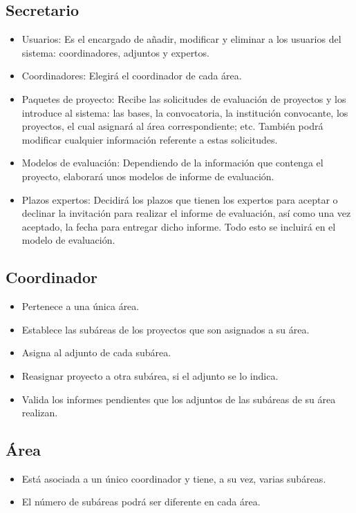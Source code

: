 \documentclass[12pt,a4paper,spanish,twoside]{book}
\begin{document}
\subsection{Secretario}
\begin{itemize}
\item Usuarios: Es el encargado de añadir, modificar y eliminar a los
  usuarios del sistema: coordinadores, adjuntos y expertos.
\item Coordinadores: Elegirá el coordinador de cada área.
\item Paquetes de proyecto: Recibe las solicitudes de evaluación de proyectos
  y los introduce al sistema: las bases, la convocatoria, la institución
  convocante, los proyectos, el cual asignará al área correspondiente;
  etc. También podrá modificar cualquier información referente a estas
  solicitudes. 
\item Modelos de evaluación: Dependiendo de la información que contenga el
  proyecto, elaborará unos modelos de informe de evaluación. 
\item Plazos expertos: Decidirá los plazos que tienen los expertos para
  aceptar o declinar la invitación para realizar el informe de evaluación,
  así como una vez aceptado, la fecha para entregar dicho informe. Todo esto
  se incluirá en el modelo de evaluación.
\end{itemize}

\subsection{Coordinador}
\begin{itemize}
\item Pertenece a una única área.
\item Establece las subáreas de los proyectos que son asignados a su área.
\item Asigna al adjunto de cada subárea.
\item Reasignar proyecto a otra subárea, si el adjunto se lo indica.
\item Valida los informes pendientes que los adjuntos de las subáreas de su
  área realizan.
\end{itemize}

\subsection{Área}
\begin{itemize}
\item Está asociada a un único coordinador y tiene, a su vez, varias subáreas. 
\item El número de subáreas podrá ser diferente en cada área.
\end{itemize}
\end{document}
